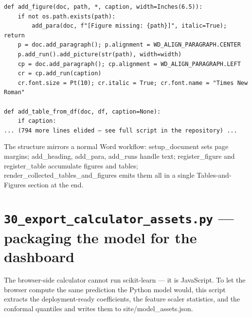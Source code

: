 \documentclass[11pt,a4paper]{article}
\begin{document}
\begin{lstlisting}[style=codeblock]
def add_figure(doc, path, *, caption, width=Inches(6.5)):
    if not os.path.exists(path):
        add_para(doc, f"[Figure missing: {path}]", italic=True); return
    p = doc.add_paragraph(); p.alignment = WD_ALIGN_PARAGRAPH.CENTER
    p.add_run().add_picture(str(path), width=width)
    cp = doc.add_paragraph(); cp.alignment = WD_ALIGN_PARAGRAPH.LEFT
    cr = cp.add_run(caption)
    cr.font.size = Pt(10); cr.italic = True; cr.font.name = "Times New Roman"

def add_table_from_df(doc, df, caption=None):
    if caption:
... (794 more lines elided — see full script in the repository) ...
\end{lstlisting}

The structure mirrors a normal Word workflow: setup\_document sets page margins; add\_heading, add\_para, add\_runs handle text; register\_figure and register\_table accumulate figures and tables; render\_collected\_tables\_and\_figures emits them all in a single Tables-and-Figures section at the end.
\clearpage
\section{\texttt{30\_export\_calculator\_assets.py} — packaging the model for the dashboard}
The browser-side calculator cannot run scikit-learn --- it is JavaScript. To let the browser compute the same prediction the Python model would, this script extracts the deployment-ready coefficients, the feature scaler statistics, and the conformal quantiles and writes them to site/model\_assets.json.
\end{document}
